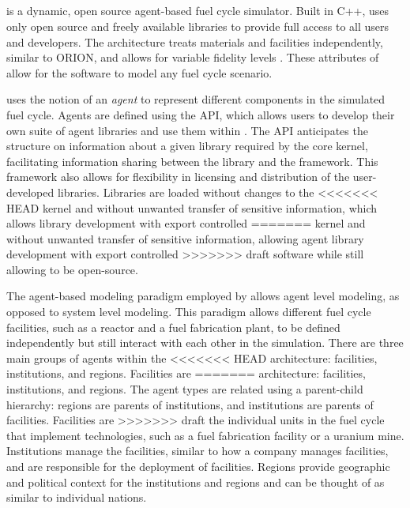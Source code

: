 \subsection{\Cyclus}
\Cyclus is a dynamic, open source agent-based fuel cycle simulator. Built 
in C++, \Cyclus uses only open source and freely available libraries to 
provide full access to all users and developers. The 
\Cyclus architecture treats materials and facilities independently, similar 
to ORION, and allows 
for variable fidelity levels \cite{huff_fundamental_2016}. These attributes
of \Cyclus allow for the software to model any fuel cycle scenario.

\Cyclus uses the notion of an \textit{agent} to represent different 
components in the simulated fuel cycle. Agents are 
defined using the \Cyclus \gls{API}, which allows users 
to develop their own suite of agent libraries and use them within \Cyclus. 
The \gls{API} anticipates the structure on information about a given 
library 
required by the core \Cyclus kernel, facilitating 
information sharing between the library and the \Cyclus framework. 
This framework 
also allows for flexibility in licensing and distribution of the 
user-developed libraries. Libraries are loaded without changes to the \Cyclus 
<<<<<<< HEAD
kernel and without unwanted transfer of sensitive information, which 
allows library development with export controlled 
=======
kernel and without unwanted transfer of sensitive information, allowing 
agent library development with export controlled 
>>>>>>> draft
software while still allowing \Cyclus to be open-source.

The agent-based modeling paradigm employed by \Cyclus allows agent level 
modeling, as opposed to system level modeling. This paradigm allows different 
fuel cycle facilities, such as a reactor and a fuel fabrication plant, to 
be defined independently but still interact with each other in the 
simulation. There are three main groups of agents within the \Cyclus 
<<<<<<< HEAD
architecture: facilities, institutions, and regions. Facilities are 
=======
architecture: facilities, institutions, and regions. The agent types
are related using a parent-child hierarchy: regions are
parents of institutions, and institutions are parents of facilities.
Facilities are 
>>>>>>> draft
the individual units in the fuel cycle that implement technologies, 
such as a fuel fabrication facility or a uranium mine. Institutions 
manage the facilities, similar to how a company manages facilities, 
and are responsible for the deployment of facilities. 
Regions provide geographic 
and political context for the institutions and regions and can be thought 
of as similar to individual nations. 

